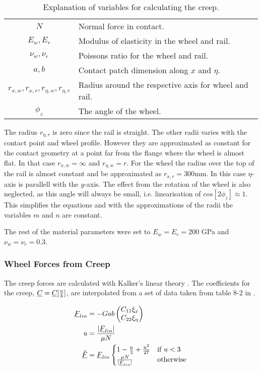 \begin{table}[htpb!]
 \centering
 \caption{Explanation of variables for calculating the creep.}
 \begin{tabular}{c | l}
  $N$                                     & Normal force in contact.\\
  $E_w,E_r$                               & Modulus of elasticity in the wheel and rail.\\
  $\nu_w,\nu_r$                           & Poissons ratio for the wheel and rail.\\
  $a,b$                                   & Contact patch dimension along $x$ and $\eta$.\\
  $r_{x,w},r_{x,r},r_{\eta,w},r_{\eta,r}$ & Radius around the respective axis for wheel and rail.\\
  $\phi_z$                                & The angle of the wheel.
 \end{tabular}
\end{table}
The radius $r_{\eta,r}$ is zero since the rail is straight. 
The other radii varies with the contact point and wheel profile. However they are approximated as constant for the contact geometry at a point far from the flange where the wheel is almost flat. In that case $r_{x,w}=\infty$ and $r_{\eta,w} = r$.
For the wheel the radius over the top of the rail is almost constant and be approximated as $r_{x,r} = 300$mm.
In this case $\eta$-axis is parallell with the $y$-axis.
The effect from the rotation of the wheel is also neglected, as this angle will always be small, i.e. linearisation of $cos[2\phi_z] \approx 1$. This simplifies the equations and with the approximations of the radii the variables $m$ and $n$ are constant.

The rest of the material parameters were set to $E_w = E_r = 200$ GPa and $\nu_w = \nu_r = 0.3$.

\subsubsection{Wheel Forces from Creep}
The creep forces are calculated with Kalker's linear theory \cite{railvehicledynamics_eandersson}.
The coefficients for the creep, $\underline{C} = \underline{C}[\frac{a}{b}]$, are interpolated from a set of data taken from table 8-2 in \cite{railvehicledynamics_eandersson}.

\begin{align}
 \underline{F}_{lin} &= - G a b \begin{pmatrix}
                          C_{11} \xi_x\\C_{22} \xi_\eta
                         \end{pmatrix}\\
 u            &= \frac{|\underline{F}_{lin}|}{\mu N}\\
 \underline{\hat{F}} &= \underline{F}_{lin} \begin{cases}
                  1-\frac{u}{3}+\frac{u^2}{27} &\text{if $u < 3$} \\
                  \frac{\mu N }{|\underline{F}_{lin}|} & \text{otherwise}
                 \end{cases}
\end{align}

